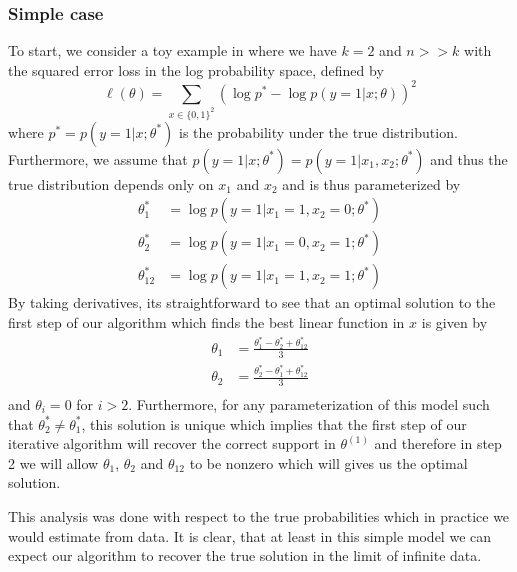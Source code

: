 \documentclass[12pt]{article}
\begin{document}
\subsubsection{Simple case}

To start, we consider a toy example in where we have $k = 2$ and $n >> k$ with the squared error loss in the log probability space, defined by
\begin{equation}
\ell(\theta) = \sum_{x \in \{0,1\}^2} (\log p^* - \log p(y=1|x;\theta))^2
\end{equation}
where $p^* = p(y=1|x;\theta^*)$ is the probability under the true distribution. Furthermore, we assume that $p(y=1|x;\theta^*) = p(y=1|x_1,x_2;\theta^*)$ and thus the true distribution depends only on $x_1$ and $x_2$ and is thus parameterized by
\begin{equation}
\begin{split}
\theta_1^* &= \log p(y=1 |x_1 = 1,x_2=0;\theta^*) \\
\theta_2^* &= \log p(y=1 |x_1 = 0,x_2=1;\theta^*) \\
\theta_{12}^* &= \log p(y=1 |x_1 = 1,x_2=1;\theta^*)
\end{split}
\end{equation}
By taking derivatives, its straightforward to see that an optimal solution to the first step of our algorithm which finds the best linear function in $x$ is given by
\begin{equation}
\begin{split}
\theta_1 &= \frac{\theta_1^* - \theta_2^* + \theta_{12}^*}{3} \\
\theta_2 &= \frac{\theta_2^* - \theta_1^* + \theta_{12}^*}{3} \\
\end{split}
\end{equation}
and $\theta_i = 0$ for $i > 2$. Furthermore, for any parameterization of this model such that $\theta_2^* \ne \theta_1^*$, this solution is unique which implies that the first step of our iterative algorithm will recover the correct support in $\theta^{(1)}$ and therefore in step 2 we will allow $\theta_1$, $\theta_2$ and $\theta_{12}$ to be nonzero which will gives us the optimal solution.

This analysis was done with respect to the true probabilities which in practice we would estimate from data. It is clear, that at least in this simple model we can expect our algorithm to recover the true solution in the limit of infinite data. 
\end{document}
